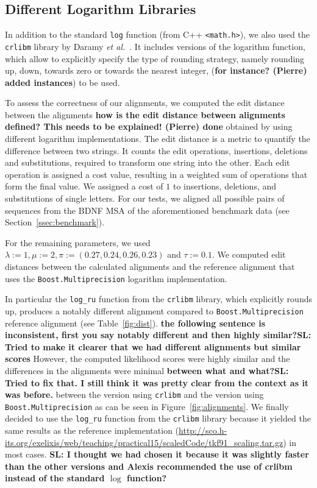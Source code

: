 \documentclass[runningheads,a4paper]{llncs}
\begin{document}

\subsection{Different Logarithm Libraries}
\label{sec:crlibm}

In addition to the standard \texttt{log} function (from C++ \texttt{<math.h>}),
we also used the \texttt{crlibm} library by Daramy {\em et al.}~\cite{Daramy04}.
It includes versions of the logarithm function, which allow to explicitly specify the type of rounding strategy, namely rounding up, down, towards zero or towards the nearest integer, ({\bf for instance? (Pierre) added instances}) to be used.

To assess the correctness of our alignments, we computed the edit distance between the alignments {\bf how is the edit distance between alignments defined? This needs to be explained! (Pierre) done}
obtained by using different logarithm implementations.
The edit distance is a metric to quantify the difference between two strings. It counts the edit operations, insertions, deletions and substitutions, required to transform one string into the other. Each edit operation is assigned a cost value, resulting in a weighted sum of operations that form the final value.
We assigned a cost of $1$ to insertions, deletions, and substitutions of single letters.
For our tests, we aligned all possible pairs of sequences from the BDNF MSA of the aforementioned benchmark data (see Section~\ref{ssec:benchmark}).

For the remaining parameters, we used $\lambda:=1, \mu:=2, \pi:= (0.27, 0.24, 0.26, 0.23)$ and $\tau := 0.1$.
We computed edit distances between the calculated alignments and the reference alignment that uses the \texttt{Boost.Multiprecision} logarithm implementation.

In particular the \texttt{log\_ru} function from the \texttt{crlibm} library, which explicitly rounds up, produces a notably different alignment compared to
\texttt{Boost.Multiprecision} reference alignment (see Table~\ref{fig:dist}).
{\bf the following sentence is inconsistent, first you say notably different and then highly similar?}{\bf SL: Tried to make it clearer that we had different alignments but similar scores}
However, the computed likelihood scores were highly similar and the differences in the alignments were minimal {\bf between what and what?}{\bf SL: Tried to fix that. I still think it was pretty clear from the context as it was before.} between the version using \texttt{crlibm} and the version using \texttt{Boost.Multiprecision} as can be seen in Figure~\ref{fig:alignments}.
We finally decided to use the \texttt{log\_ru} function from the \texttt{crlibm} library because it yielded the same results as the reference implementation
(\url{http://sco.h-its.org/exelixis/web/teaching/practical15/scaledCode/tkf91_scaling.tar.gz}) in most cases. {\bf SL: I thought we had chosen it because it was slightly faster than the other versions and Alexis recommended the use of crlibm instead of the standard $\log$ function?}
\end{document}
